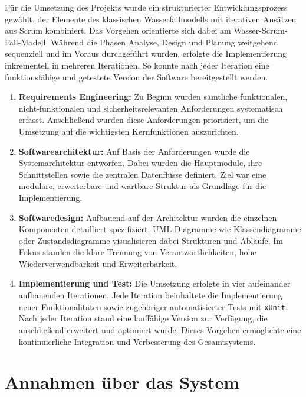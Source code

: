 \documentclass[a4paper,12pt]{article}
\begin{document}
Für die Umsetzung des Projekts wurde ein strukturierter Entwicklungsprozess gewählt, der Elemente des klassischen Wasserfallmodells mit iterativen Ansätzen aus Scrum kombiniert. Das Vorgehen orientierte sich dabei am Wasser-Scrum-Fall-Modell. Während die Phasen Analyse, Design und Planung weitgehend sequenziell und im Voraus durchgeführt wurden, erfolgte die Implementierung inkrementell in mehreren Iterationen. So konnte nach jeder Iteration eine funktionsfähige und getestete Version der Software bereitgestellt werden.

\begin{enumerate}
    \item \textbf{Requirements Engineering:}  
    Zu Beginn wurden sämtliche funktionalen, nicht-funktionalen und sicherheitsrelevanten Anforderungen systematisch erfasst. Anschließend wurden diese Anforderungen priorisiert, um die Umsetzung auf die wichtigsten Kernfunktionen auszurichten.

    \item \textbf{Softwarearchitektur:}  
    Auf Basis der Anforderungen wurde die Systemarchitektur entworfen. Dabei wurden die Hauptmodule, ihre Schnittstellen sowie die zentralen Datenflüsse definiert. Ziel war eine modulare, erweiterbare und wartbare Struktur als Grundlage für die Implementierung.

    \item \textbf{Softwaredesign:}  
    Aufbauend auf der Architektur wurden die einzelnen Komponenten detailliert spezifiziert. UML-Diagramme wie Klassendiagramme oder Zustandsdiagramme visualisieren dabei Strukturen und Abläufe. Im Fokus standen die klare Trennung von Verantwortlichkeiten, hohe Wiederverwendbarkeit und Erweiterbarkeit.

    \item \textbf{Implementierung und Test:}  
    Die Umsetzung erfolgte in vier aufeinander aufbauenden Iterationen. Jede Iteration beinhaltete die Implementierung neuer Funktionalitäten sowie zugehöriger automatisierter Tests mit \texttt{xUnit}. Nach jeder Iteration stand eine lauffähige Version zur Verfügung, die anschließend erweitert und optimiert wurde. Dieses Vorgehen ermöglichte eine kontinuierliche Integration und Verbesserung des Gesamtsystems.
\end{enumerate}

\newpage

\section{Annahmen über das System}
\end{document}
